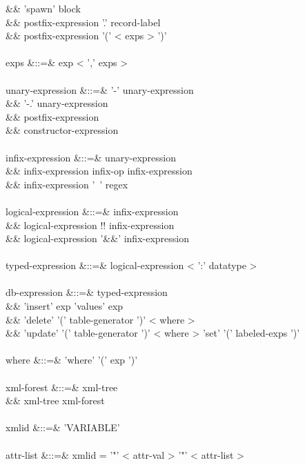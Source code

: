 \documentclass[11pt,a4paper]{article}
\begin{document}
\begin{grammar}
&&                        'spawn' block \\
&&                        postfix-expression '.' record-label \\
&&                        postfix-expression '(' < exps > ')' \\
\\
exps &::=& exp < ',' exps >  \\
\\
unary-expression &::=& '-' unary-expression \\
&&                     '-.' unary-expression \\
&&                     postfix-expression \\
&&                     constructor-expression \\
\\
infix-expression &::=& unary-expression \\
&&                     infix-expression infix-op infix-expression \\
&&                     infix-expression '~' regex \\
\\
logical-expression &::=& infix-expression \\
&&                       logical-expression !! infix-expression \\
&&                       logical-expression '&&' infix-expression \\
\\
typed-expression &::=& logical-expression < ':' datatype > \\
\\
db-expression &::=& typed-expression \\
&&                  'insert' exp 'values' exp \\
&&                  'delete' '(' table-generator ')' < where >  \\
&&                  'update' '(' table-generator ')' < where > 'set' '(' labeled-exps ')' \\
\\
where &::=& 'where' '(' exp ')' \\
\\
xml-forest &::=& xml-tree \\
&&               xml-tree xml-forest \\
\\
xmlid &::=& 'VARIABLE' \\
\\
attr-list &::=& xmlid = '"' < attr-val > '"' < attr-list >  \\

\end{grammar}
\end{document}
